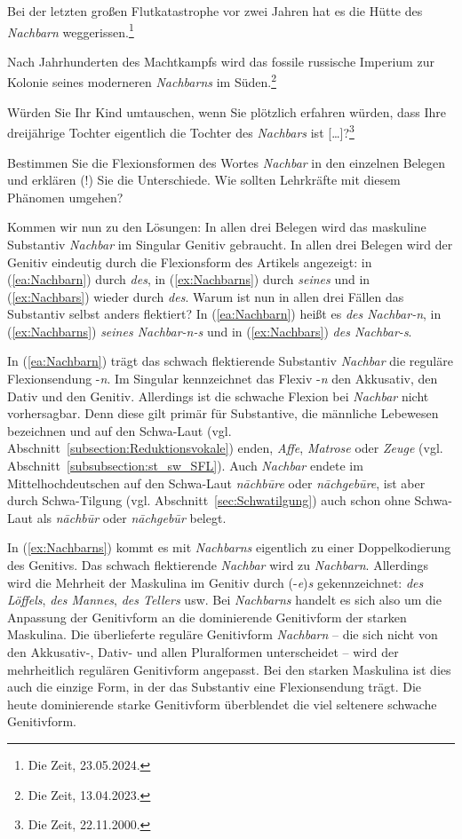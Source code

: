 \ea \label{ea:Nachbar}
\ea \label{ea:Nachbarn} Bei der letzten großen Flutkatastrophe vor zwei Jahren hat es die Hütte des \textit{Nachbarn} weggerissen.\footnote{Die Zeit, 23.05.2024.}

\ex \label{ex:Nachbarns} Nach Jahrhunderten des Machtkampfs wird das fossile russische Imperium zur Kolonie seines moderneren \textit{Nachbarns} im Süden.\footnote{Die Zeit, 13.04.2023.}

\ex \label{ex:Nachbars} Würden Sie Ihr Kind umtauschen, wenn Sie plötzlich erfahren würden, dass Ihre dreijährige Tochter eigentlich die Tochter des \textit{Nachbars} ist [\ldots{}]?\footnote{Die Zeit, 22.11.2000.}
\z 
\z 

Bestimmen Sie die Flexionsformen des Wortes \textit{Nachbar} in den einzelnen Belegen und erklären (!) Sie die Unterschiede. Wie sollten Lehrkräfte mit diesem Phänomen umgehen?


Kommen wir nun zu den Lösungen: In allen drei Belegen wird das maskuline Substantiv \textit{Nachbar} im Singular Genitiv gebraucht. In allen drei Belegen wird der Genitiv eindeutig durch die Flexionsform des Artikels angezeigt: in (\ref{ea:Nachbarn}) durch \textit{des}, in (\ref{ex:Nachbarns}) durch \textit{seines} und in (\ref{ex:Nachbars}) wieder durch \textit{des}. Warum ist nun in allen drei Fällen das Substantiv selbst anders flektiert? In (\ref{ea:Nachbarn}) heißt es \textit{des Nachbar-n}, in (\ref{ex:Nachbarns}) \textit{seines Nachbar-n-s} und in (\ref{ex:Nachbars}) \textit{des Nachbar-s}.

In (\ref{ea:Nachbarn}) trägt das schwach flektierende Substantiv \textit{Nachbar} die reguläre Flexionsendung -\textit{n}. Im Singular kennzeichnet das Flexiv -\textit{n} den Akkusativ, den Dativ und den Genitiv. Allerdings ist die schwache Flexion bei \textit{Nachbar} nicht vorhersagbar. Denn diese gilt primär für Substantive, die männliche Lebewesen bezeichnen und auf den Schwa-Laut (vgl. Abschnitt~\ref{subsection:Reduktionsvokale}) enden, \zB \textit{Affe}, \textit{Matrose} oder \textit{Zeuge} (vgl. Abschnitt~\ref{subsubsection:st_sw_SFL}). Auch \textit{Nachbar} endete im Mittelhochdeutschen auf den Schwa-Laut \textit{nāchbūre} oder \textit{nāchgebūre}, ist aber durch Schwa-Tilgung (vgl. Abschnitt~\ref{sec:Schwatilgung}) auch schon ohne Schwa-Laut als \textit{nāchbūr} oder \textit{nāchgebūr} belegt.  


In (\ref{ex:Nachbarns}) kommt es mit \textit{Nachbarns} eigentlich zu einer Doppelkodierung des Genitivs. Das schwach flektierende \textit{Nachbar} wird zu \textit{Nachbarn}. Allerdings wird die Mehrheit der Maskulina im Genitiv durch (-\textit{e})\textit{s} gekennzeichnet: \textit{des Löffels}, \textit{des Mannes}, \textit{des Tellers} usw. Bei \textit{Nachbarns} handelt es sich also um die Anpassung der Genitivform an die dominierende Genitivform der starken Maskulina. Die überlieferte reguläre Genitivform \textit{Nachbarn} -- die sich nicht von den Akkusativ-, Dativ- und allen Pluralformen unterscheidet -- wird der mehrheitlich regulären Genitivform angepasst. Bei den starken Maskulina ist dies auch die einzige Form, in der das Substantiv eine Flexionsendung trägt. Die heute dominierende starke Genitivform überblendet die viel seltenere schwache Genitivform. 

